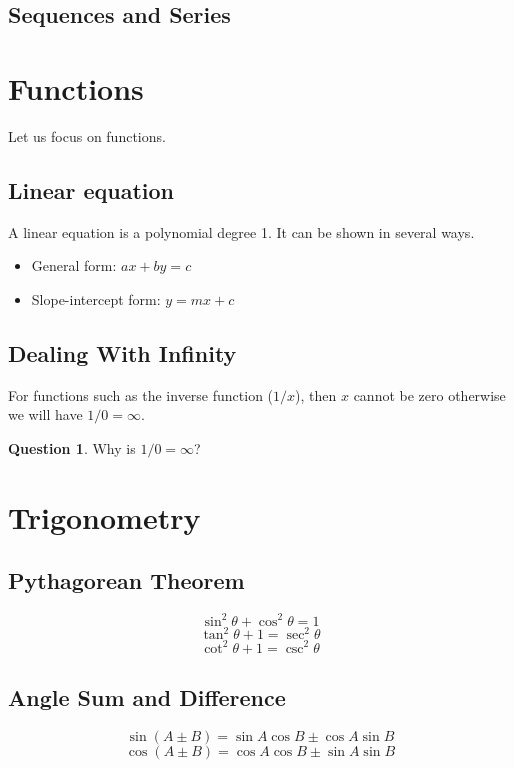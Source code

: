 \documentclass[a4paper]{article}
\theoremstyle{plain}
\theoremstyle{definition}
\newtheorem{question}{Question}[section]
\theoremstyle{remark}
\newcommand{\sectionSpace}{\vspace{2em}} %
\newcommand{\subsectionSpace}{\vspace{0.5em}}
\begin{document}
    \subsectionSpace
    \subsection{Sequences and Series}



\sectionSpace
\section{Functions}
Let us focus on functions. 
    \subsection{Linear equation}
    A linear equation is a polynomial degree 1. It can be shown in several ways.
    \begin{itemize}
        \item General form: $ax + by = c$
        \item Slope-intercept form: $y = mx + c$
    \end{itemize}

    \subsectionSpace
    \subsection{Dealing With Infinity}
    For functions such as the inverse function ($1/x$), then $x$ cannot be zero otherwise we will have $1/0 = \infty$. 
    \begin{question}
        Why is $1/0 = \infty$?
    \end{question}


\sectionSpace
\section{Trigonometry}
    \subsection{Pythagorean Theorem}
    \[\sin^2\theta + \cos^2\theta= 1\]
    \[\tan^2\theta + 1 = \sec^2\theta\]
    \[\cot^2\theta + 1 = \csc^2\theta\]

    \subsectionSpace
    \subsection{Angle Sum and Difference}
    $$\sin(A \pm B) = \sin A \cos B \pm \cos A \sin B$$
    $$\cos(A \pm B) = \cos A \cos B \pm \sin A \sin B$$

    \subsectionSpace
\end{document}
